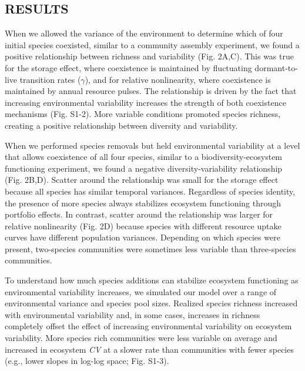 \documentclass[12pt,]{article}
\begin{document}
\subsection{RESULTS}\label{results}

When we allowed the variance of the environment to determine which of
four initial species coexisted, similar to a community assembly
experiment, we found a positive relationship between richness and
variability (Fig. 2A,C). This was true for the storage effect, where
coexistence is maintained by fluctuating dormant-to-live transition
rates (\(\gamma\)), and for relative nonlinearity, where coexistence is
maintained by annual resource pulses. The relationship is driven by the
fact that increasing environmental variability increases the strength of
both coexistence mechanisms (Fig. S1-2). More variable conditions
promoted species richness, creating a positive relationship between
diversity and variability.

When we performed species removals but held environmental variability at
a level that allows coexistence of all four species, similar to a
biodiversity-ecosystem functioning experiment, we found a negative
diversity-variability relationship (Fig. 2B,D). Scatter around the
relationship was small for the storage effect because all species has
similar temporal variances. Regardless of species identity, the presence
of more species always stabilizes ecosystem functioning through
portfolio effects. In contrast, scatter around the relationship was
larger for relative nonlinearity (Fig. 2D) because species with
different resource uptake curves have different population variances.
Depending on which species were present, two-species communities were
sometimes less variable than three-species communities.

To understand how much species additions can stabilize ecosystem
functioning as environmental variability increases, we simulated our
model over a range of environmental variance and species pool sizes.
Realized species richness increased with environmental variability and,
in some cases, increases in richness completely offset the effect of
increasing environmental variability on ecosystem variability. More
species rich communities were less variable on average and increased in
ecosystem \emph{CV} at a slower rate than communities with fewer species
(e.g., lower slopes in log-log space; Fig. S1-3).
\end{document}
